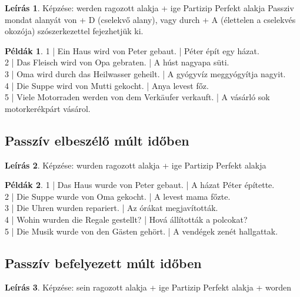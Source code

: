 \documentclass{article}
\theoremstyle{definition}
\newtheorem*{exmp}{Példák}
\newtheorem*{desc}{Leírás}
\begin{document}
\begin{desc}
Képzése: werden ragozott alakja + ige Partizip Perfekt alakja
Passziv mondat alanyát von + D (cselekvő alany), vagy durch + A (élettelen a cselekvés okozója) szószerkezettel fejezhetjük ki.
\end{desc}

\begin{exmp}
1 | Ein Haus wird von Peter gebaut. | Péter épít egy házat.\\
2 | Das Fleisch wird von Opa gebraten. | A húst nagyapa süti.\\
3 | Oma wird durch das Heilwasser geheilt. | A gyógyvíz meggyógyítja nagyit.\\
4 | Die Suppe wird von Mutti gekocht. | Anya levest főz.\\
5 | Viele Motorraden werden von dem Verkäufer verkauft. | A vásárló sok motorkerékpárt vásárol.\\
\end{exmp}

\subsection{Passzív elbeszélő múlt időben}

\begin{desc}
Képzése: wurden ragozott alakja + ige Partizip Perfekt alakja
\end{desc}

\begin{exmp}
1 | Das Haus wurde von Peter gebaut. | A házat Péter építette.\\
2 | Die Suppe wurde von Oma gekocht. | A levest mama főzte.\\
3 | Die Uhren wurden repariert. | Az órákat megjavították.\\
4 | Wohin wurden die Regale gestellt? | Hová állították a polcokat?\\
5 | Die Musik wurde von den Gästen gehört. | A vendégek zenét hallgattak.\\
\end{exmp}

\subsection{Passzív befelyezett múlt időben}

\begin{desc}
Képzése: sein ragozott alakja + ige Partizip Perfekt alakja + worden
\end{desc}
\end{document}
